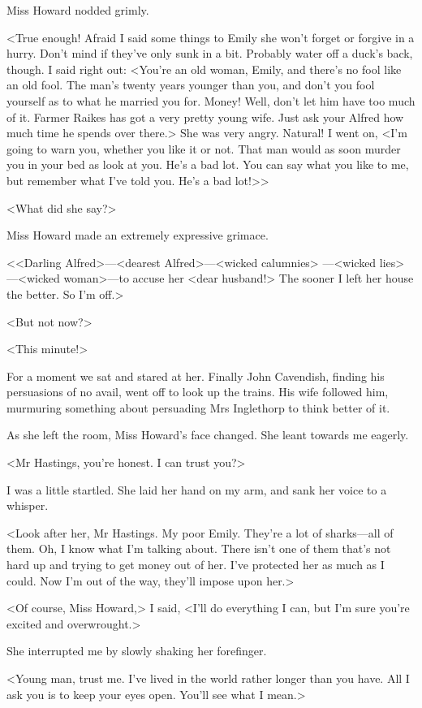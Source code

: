  Miss Howard nodded grimly. 

 <True enough! Afraid I said some things to Emily she won't forget or forgive in a hurry. Don't mind if they've only sunk in a bit. Probably water off a duck's back, though. I said right out: <You're an old woman, Emily, and there's no fool like an old fool. The man's twenty years younger than you, and don't you fool yourself as to what he married you for. Money! Well, don't let him have too much of it. Farmer Raikes has got a very pretty young wife. Just ask your Alfred how much time he spends over there.> She was very angry. Natural! I went on, <I'm going to warn you, whether you like it or not. That man would as soon murder you in your bed as look at you. He's a bad lot. You can say what you like to me, but remember what I've told you. He's a bad lot!>> 

 <What did she say?> 

 Miss Howard made an extremely expressive grimace. 

 <<Darling Alfred>—<dearest Alfred>—<wicked calumnies> —<wicked lies>—<wicked woman>—to accuse her <dear husband!> The sooner I left her house the better. So I'm off.> 

 <But not now?> 

 <This minute!> 

 For a moment we sat and stared at her. Finally John Cavendish, finding his persuasions of no avail, went off to look up the trains. His wife followed him, murmuring something about persuading Mrs Inglethorp to think better of it. 

 As she left the room, Miss Howard's face changed. She leant towards me eagerly. 

 <Mr Hastings, you're honest. I can trust you?> 

 I was a little startled. She laid her hand on my arm, and sank her voice to a whisper. 

 <Look after her, Mr Hastings. My poor Emily. They're a lot of sharks—all of them. Oh, I know what I'm talking about. There isn't one of them that's not hard up and trying to get money out of her. I've protected her as much as I could. Now I'm out of the way, they'll impose upon her.> 

 <Of course, Miss Howard,> I said, <I'll do everything I can, but I'm sure you're excited and overwrought.> 

 She interrupted me by slowly shaking her forefinger. 

 <Young man, trust me. I've lived in the world rather longer than you have. All I ask you is to keep your eyes open. You'll see what I mean.> 

